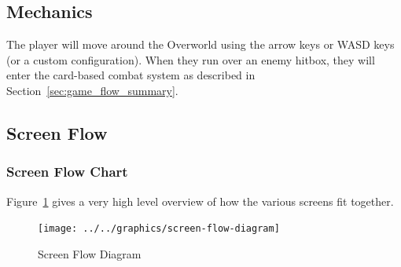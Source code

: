 \documentclass[12pt,titlepage]{article}
\begin{document}
\subsection{Mechanics}

The player will move around the Overworld using the arrow keys or WASD keys (or
a custom configuration). When they run over an enemy hitbox, they will enter the
card-based combat system as described in Section~\ref{sec:game_flow_summary}.


\subsection{Screen Flow}

\subsubsection{Screen Flow Chart}
Figure~\ref{fig:screen_flow_chart} gives a very high level overview of how the
various screens fit together.
\begin{figure}[H]
    \centering
    \caption{Screen Flow Diagram}
    \label{fig:screen_flow_chart}
    \texttt{[image: ../../graphics/screen-flow-diagram]}
\end{figure}
\end{document}
